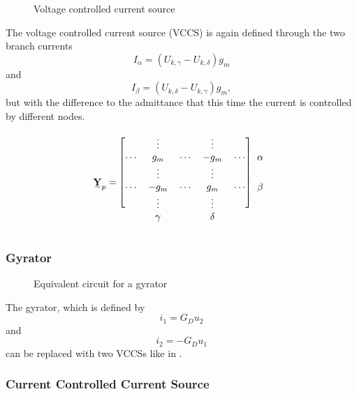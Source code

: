 \begin{figure}
	\centering
	
	\caption{Voltage controlled current source}
	\label{fig:voltage_controlled_current_source}
\end{figure}

The voltage controlled current source (VCCS) is again defined through the two branch currents
\begin{equation}
	I_\alpha = (U_{k,\gamma} - U_{k,\delta}) g_m
\end{equation}
and
\begin{equation}
	I_\beta = (U_{k,\delta} - U_{k,\gamma}) g_m,
\end{equation}
but with the difference to the admittance that this time the current is controlled by different nodes.

\begin{equation}
	\mat Y_p = 	
	\begin{blockarray}{cccccc}
		\begin{block}{[ccccc]c}
		 		& \vdots	&			& \vdots	&			& \\
		\cdots	& g_m		& \cdots	& -g_m		& \cdots	& \alpha \\
		 		& \vdots	&			& \vdots	&			& \\
		\cdots	& -g_m		& \cdots	& g_m		& \cdots	& \beta \\
		 		& \vdots	&			& \vdots	&			& \\
		\end{block}
				& \gamma	&			& \delta	&			& 
	\end{blockarray}
\end{equation}

\subsubsection{Gyrator}

\begin{figure}
	\centering
	
	\caption{Equivalent circuit for a gyrator}
	\label{fig:gyrator}
\end{figure}

The gyrator, which is defined by
\begin{equation}
	i_1 = G_D u_2
\end{equation}
and
\begin{equation}
	i_2 = -G_D u_1
\end{equation}
can be replaced with two VCCSs like in .

\subsubsection{Current Controlled Current Source}

